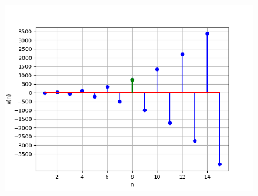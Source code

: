\documentclass[journal,12pt,twocolumn]{IEEEtran}
\theoremstyle{remark}
\begin{document}
\begin{figure}[h]
    \centering
    \includegraphics[width=1 \columnwidth]{ncert-maths/11/9/1/9/figs/graph.png} 
    \label{fig:11.9.1.9.1}
\end{figure}
\end{document}
